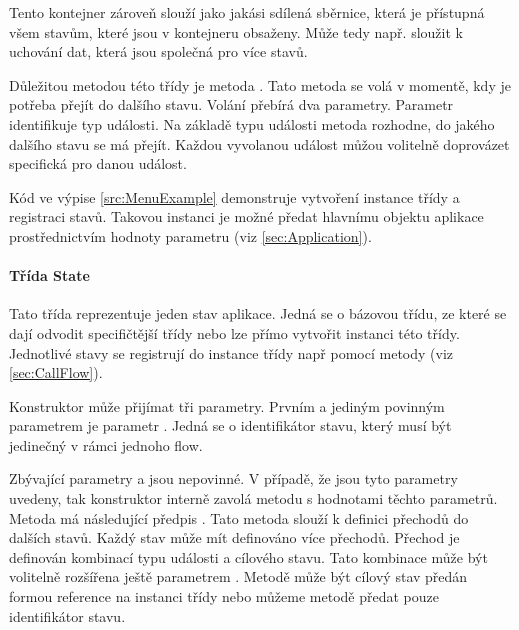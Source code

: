 \documentclass[ing,male,java,dept460]{diploma}						%
\begin{document}
Tento kontejner zároveň slouží jako jakási sdílená sběrnice, která je přístupná všem stavům, které jsou v kontejneru obsaženy. Může tedy např. sloužit k uchování dat, která jsou společná pro více stavů.

Důležitou metodou této třídy je metoda . Tato metoda se volá v momentě, kdy je potřeba přejít do dalšího stavu. Volání přebírá dva parametry. Parametr  identifikuje typ události. Na základě typu události metoda rozhodne, do jakého dalšího stavu se má přejít. Každou vyvolanou událost můžou volitelně doprovázet  specifická pro danou událost.

Kód ve výpise \ref{src:MenuExample} demonstruje vytvoření instance třídy  a registraci stavů. Takovou instanci je možné předat hlavnímu objektu aplikace prostřednictvím hodnoty parametru  (viz \ref{sec:Application}).

\paragraph{Třída State}
\label{sec:State}
Tato třída reprezentuje jeden stav aplikace. Jedná se o bázovou třídu, ze které se dají odvodit specifičtější třídy nebo lze přímo vytvořit instanci této třídy. Jednotlivé stavy se registrují do instance třídy  např pomocí metody  (viz \ref{sec:CallFlow}).

Konstruktor může přijímat tři parametry. Prvním a jediným povinným parametrem je parametr . Jedná se o identifikátor stavu, který musí být jedinečný v rámci jednoho flow.

Zbývající parametry  a  jsou nepovinné. V případě, že jsou tyto parametry uvedeny, tak konstruktor interně zavolá metodu  s hodnotami těchto parametrů. Metoda má následující předpis . Tato metoda slouží k definici přechodů do dalších stavů. Každý stav může mít definováno více přechodů. Přechod je definován kombinací typu události a cílového stavu. Tato kombinace může být volitelně rozšířena ještě parametrem . Metodě  může být cílový stav  předán formou reference na instanci třídy  nebo můžeme metodě předat pouze identifikátor stavu.
\end{document}
